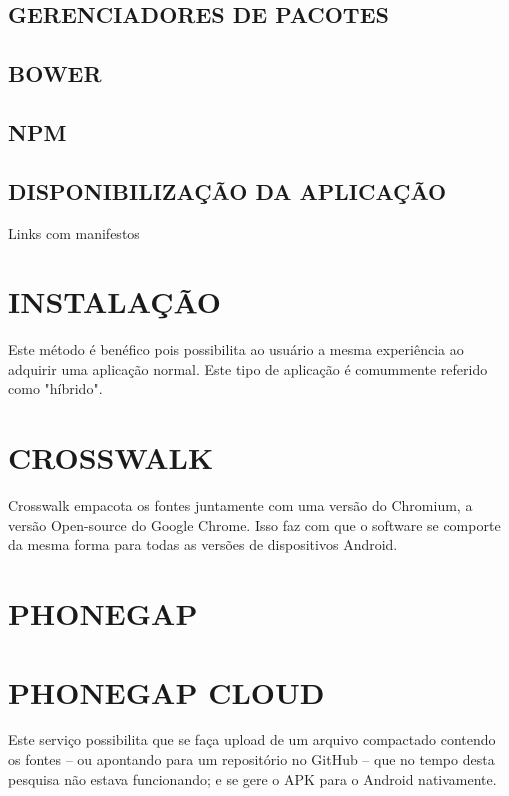 \documentclass[11pt,a4paper]{article}
\begin{document}
\subsection{GERENCIADORES DE PACOTES}

\subsection{BOWER}


\subsection{NPM}


\subsection{DISPONIBILIZAÇÃO DA APLICAÇÃO}

Links com manifestos

\section{ INSTALAÇÃO}

Este método é benéfico pois possibilita ao usuário a mesma
experiência ao adquirir uma aplicação normal. Este tipo de
aplicação é comummente referido como "híbrido".

\section{ CROSSWALK}

Crosswalk empacota os fontes juntamente com uma versão do Chromium, a
versão Open-source do Google Chrome. Isso faz com que o software se
comporte da mesma forma para todas as versões de dispositivos Android.

\section{ PHONEGAP}

\section{ PHONEGAP CLOUD}

Este serviço possibilita que se faça upload de um arquivo compactado
contendo os fontes – ou apontando para um repositório no GitHub –
que no tempo desta pesquisa não estava funcionando; e se gere o APK
para o Android nativamente.
\end{document}

